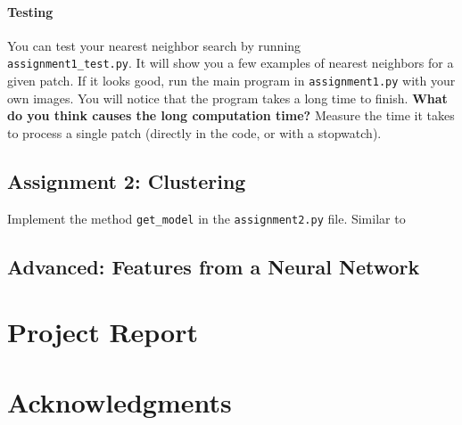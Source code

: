 \documentclass[]{article}
\begin{document}
		\paragraph{Testing}
		You can test your nearest neighbor search by running \\
		\verb|assignment1_test.py|. 
		It will show you a few examples of nearest neighbors for a given patch.
		If it looks good, run the main program in \verb|assignment1.py| with your own images.
		You will notice that the program takes a long time to finish. 
		\textbf{What do you think causes the long computation time?}
		Measure the time it takes to process a single patch (directly in the code, or with a stopwatch).
	
	\subsection{Assignment 2: Clustering}
		Implement the method \verb|get_model| in the \verb|assignment2.py| file.
		Similar to 
		
	\subsection{Advanced: Features from a Neural Network}

\section{Project Report}

\section{Acknowledgments}
\end{document}
